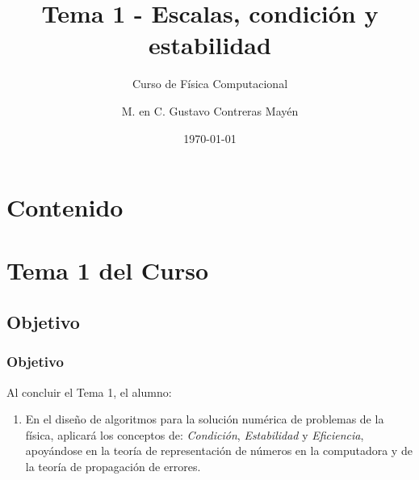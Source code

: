 



\title{\large{Tema 1 - Escalas, condición y estabilidad}}
\subtitle{Curso de Física Computacional}
\author[]{M. en C. Gustavo Contreras Mayén}
\date{\today}

\maketitle
\section*{Contenido}
\fontsize{14}{14}\selectfont
{}
\section{Tema 1 del Curso}
\subsection{Objetivo}
\begin{frame}
\frametitle{Objetivo}
Al concluir el Tema 1, el alumno:
\begin{enumerate}
\item En el diseño de algoritmos para la solución numérica de problemas de la física, aplicará los conceptos de: \textit{Condición}, \textit{Estabilidad} y \textit{Eficiencia}, apoyándose en la teoría de representación de números en la computadora y de la teoría de propagación de errores.
\end{enumerate}
\end{frame}
